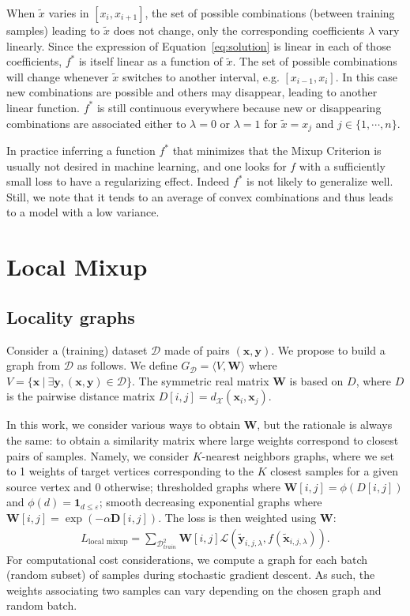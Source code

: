 \documentclass[twoside]{article}
\numberwithin{intassumption}{assumption}
\begin{document}
When $\tilde{x}$ varies in $[x_i,x_{i+1}]$, the set of possible combinations (between training samples) leading to $\tilde{x}$ does not change, only the corresponding coefficients $\lambda$ vary linearly. Since the expression of Equation~\eqref{eq:solution} is linear in each of those coefficients, $f^*$ is itself linear as a function of $\tilde x$. The set of possible combinations will change whenever $\tilde x$ switches to another interval, e.g. $[x_{i-1},x_i]$. In this case new combinations are possible and others may disappear, leading to another linear function. $f^*$ is still continuous everywhere because new or disappearing combinations are associated either to $\lambda = 0$ or $\lambda=1$ for $\tilde{x} = x_{j}$ and $ j \in \{1,\cdots,n\}$.

In practice inferring a function $f^*$ that minimizes that the Mixup Criterion is usually not desired in machine learning, and one looks for $f$ with a sufficiently small loss to have a regularizing effect. Indeed $f^*$ is not likely to generalize well. Still, we note that it tends to an average of convex combinations and thus leads to a model with a low variance. 

\section{Local Mixup}



\subsection{Locality graphs}
Consider a (training) dataset $\mathcal{D}$ made of pairs $(\mathbf{x}, \mathbf{y})$. We propose to build a graph from $\mathcal{D}$ as follows. We define $G_{\mathcal{D}} = \langle V, \mathbf{W} \rangle$ where $V = \{\mathbf{x} \ \vert \ \exists \mathbf{y}, (\mathbf{x},\mathbf{y}) \in \mathcal{D}\}$. The symmetric real matrix $\mathbf{W}$ is based on $D$, where $D$ is the pairwise distance matrix $D[i,j] = d_\mathcal{X}(\mathbf{x}_i, \mathbf{x}_j)$.

In this work, we consider various ways to obtain $\mathbf{W}$, but the rationale is always the same: to obtain a similarity matrix where large weights correspond to closest pairs of samples. Namely, we consider $K$-nearest neighbors graphs, where we set to 1 weights of target vertices corresponding to the $K$ closest samples for a given source vertex and 0 otherwise; thresholded graphs where $\mathbf{W}[i,j] = \phi(D[i, j])$ and $\phi(d) = \mathbf{1}_{d \leq \varepsilon}$; smooth decreasing exponential graphs where $\mathbf{W}[i, j] = \exp( -\alpha \mathbf{D}[i,j])$. The loss is then weighted using $\mathbf{W}$: 
 \begin{align}
L_{\text{local mixup}} = \sum_{\mathcal{D}_{train}^2}\mathbf{W}[i, j]\mathcal{L}\left( \mathbf{\tilde y}_{i,j,\lambda} ,f(\mathbf{\tilde  x}_{i,j,\lambda})\right).
\end{align} 
For computational cost considerations, we compute a graph for each batch (random subset) of samples during stochastic gradient descent. As such, the weights associating two samples can vary depending on the chosen graph and random batch.
\end{document}

